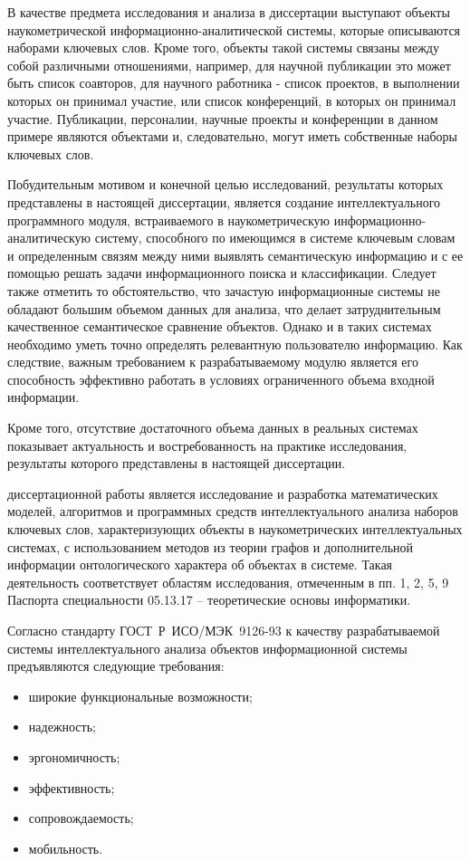
{\actuality} В качестве предмета исследования и анализа в диссертации выступают объекты наукометрической информационно-аналитической системы, которые описываются наборами ключевых слов. Кроме того, объекты такой системы связаны между собой различными отношениями, например, для научной публикации это может быть список соавторов, для научного работника - список проектов, в выполнении которых он принимал участие, или список конференций, в которых он принимал участие. Публикации, персоналии, научные проекты и конференции в данном примере являются объектами и, следовательно, могут иметь собственные наборы ключевых слов. 

Побудительным мотивом и конечной целью исследований, результаты которых представлены в настоящей диссертации, является создание интеллектуального программного модуля, встраиваемого в наукометрическую информационно-аналитическую систему, способного по имеющимся в системе ключевым словам и определенным связям между ними выявлять семантическую информацию и с ее помощью решать задачи информационного поиска и классификации. Следует также отметить то обстоятельство, что зачастую информационные системы не обладают большим объемом данных для анализа, что делает затруднительным качественное семантическое сравнение объектов. Однако и в таких системах необходимо уметь точно определять релевантную пользователю информацию. Как следствие, важным требованием к разрабатываемому модулю является его способность эффективно работать в условиях ограниченного объема входной информации.

Кроме того, отсутствие достаточного объема данных в реальных системах показывает актуальность и востребованность на практике исследования, результаты которого представлены в настоящей диссертации.

{\aim}  диссертационной работы является исследование и разработка математических моделей, алгоритмов и программных средств интеллектуального анализа наборов ключевых слов, характеризующих объекты в наукометрических интеллектуальных системах, с использованием методов из теории графов и дополнительной информации онтологического характера об объектах в системе. Такая деятельность соответствует областям исследования, отмеченным в пп. 1, 2, 5, 9 Паспорта специальности 05.13.17 – теоретические основы информатики.

{\workrequirements}
Согласно стандарту \mbox{ГОСТ Р ИСО/МЭК 9126-93} к качеству разрабатываемой системы интеллектуального анализа объектов информационной системы предъявляются следующие требования:
\begin{itemize}
    \item широкие функциональные возможности; 
    \item надежность;
    \item эргономичность;
    \item эффективность;
    \item сопровождаемость;
    \item мобильность.
\end{itemize}

